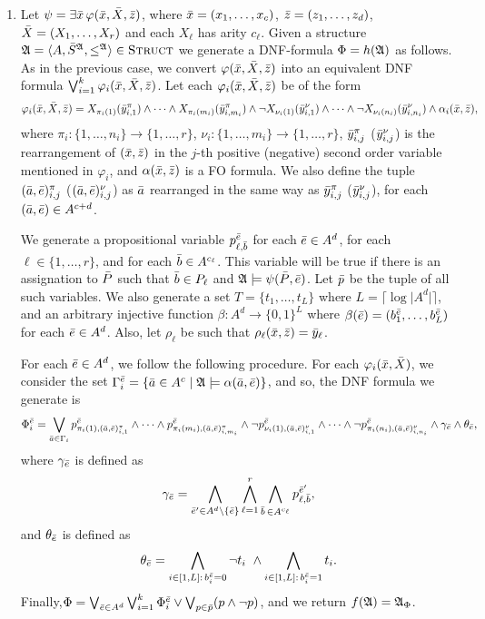 \begin{enumerate}
	\item Let $\psi = \exists \x\,\varphi(\x,\X,\z)$, where $\x = (x_1,\ldots,x_c)$, $\z = (z_1,\ldots,z_d)$, $\X = (X_1,\ldots,X_r)$ and each $X_{\ell}$ has arity $c_{\ell}$. Given a structure $\A = \langle A, \S^{\A}, \leq^{\A} \rangle\in\str$ we generate a DNF-formula $\Phi = h(\A)$ as follows. As in the previous case, we convert $\varphi(\x,\X,\z)$ into an equivalent DNF formula $\bigvee_{i = 1}^k \varphi_{i}(\x,\X,\z)$. Let each $\varphi_{i}(\x,\X,\z)$ be of the form
	\[
	\varphi_{i}(\x,\X,\z) = X_{\pi_i(1)}(\y^{\pi}_{i,1}) \wedge \cdots \wedge X_{\pi_i(m_i)}(\y^{\pi}_{i,m_i}) \wedge \neg X_{\nu_i(1)}(\y^{\nu}_{i,1}) \wedge \cdots \wedge \neg X_{\nu_i(n_i)}(\y^{\nu}_{i,n_i}) \wedge \alpha_i(\x,\z),
	\]
	where $\pi_i:\{1,\ldots,n_i\}\to\{1,\ldots,r\}$, $\nu_i:\{1,\ldots,m_i\}\to\{1,\ldots,r\}$, $\y^{\pi}_{i,j}$ ($\y^{\nu}_{i,j}$) is the rearrangement of $(\x,\z)$ in the $j$-th positive (negative) second order variable mentioned in $\varphi_i$, and $\alpha(\x,\z)$ is a FO formula. We also define the tuple $(\a,\e)^{\pi}_{i,j}$ ($(\a,\e)^{\nu}_{i,j}$) as $\a$ rearranged in the same way as $\y^{\pi}_{i,j}$ ($\y^{\nu}_{i,j}$), for each $(\a,\e)\in A^{c+d}$.
	
	We generate a propositional variable $p^{\e}_{\ell,\b}$ for each $\e\in A^d$, for each $\ell\in\{1,\ldots,r\}$, and for each $\b\in A^{c_{\ell}}$. This variable will be true if there is an assignation to $\P$ such that $\b\in P_{\ell}$ and $\A\models\psi(\P,\e)$. Let $\p$ be the tuple of all such variables. We also generate a set $T = \{t_1,\ldots,t_{L}\}$ where $L = \lceil \log\vert A^d\vert \rceil$, and an arbitrary injective function $\beta:A^d \to \{0,1\}^L$ where $\beta(\e) = (b^{\e}_1,\ldots,b^{\e}_L)$ for each $\e\in A^d$. Also, let $\rho_{\ell}$ be such that $\rho_{\ell}(\x,\z) = \y_{\ell}$.
	
	For each $\e\in A^d$, we follow the following procedure. For each $\varphi_i(\x,\X)$, we consider the set $\Gamma^{\e}_i = \{\a\in A^c\mid \A\models\alpha(\a,\e)\}$, and so, the DNF formula we generate is
	\[
	\Phi^{\e}_i = \bigvee_{\a\in\Gamma_i} p^{\e}_{\pi_i(1),(\a,\e)^{\pi}_{i,1}} \wedge \cdots \wedge p^{\e}_{\pi_i(m_i),(\a,\e)^{\pi}_{i,m_i}} \wedge \neg p^{\e}_{\nu_i(1),(\a,\e)^{\nu}_{i,1}} \wedge \cdots \wedge \neg p^{\e}_{\pi_i(n_i),(\a,\e)^{\nu}_{i,n_i}} \wedge \gamma_{\e} \wedge \theta_{\e},
	\]
	where $\gamma_{\e}$ is defined as
	\[
	\gamma_{\e} = \bigwedge_{\e'\in A^d\setminus\{\e\}} \bigwedge_{\ell = 1}^r \bigwedge_{\b\,\in A^{c_{\ell}}} p_{\ell,\b}^{\e'},
	\]
	and $\theta_{\e}$ is defined as
	\[
	\theta_{\e} = \bigwedge_{i\in[1,L]:\,b^{\e}_i = 0} \neg t_i\  \wedge \bigwedge_{i\in[1,L]:\,b^{\e}_i = 1} t_i.
	\]
	Finally,$\Phi = \bigvee_{\e\in A^d} \bigvee_{i = 1}^k \Phi_i^{\e} \vee \bigvee_{p\in\p} (p\wedge\neg p)$, and we return $f(\A) = \A_{\Phi}$.
	

\end{enumerate}

